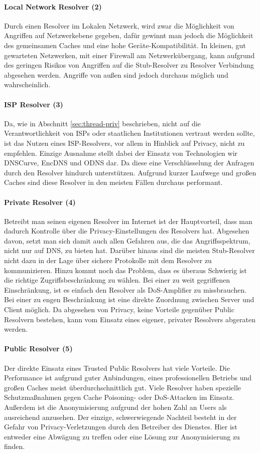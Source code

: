 \paragraph{Local Network Resolver (2)}
Durch einen Resolver im Lokalen Netzwerk, wird zwar die Möglichkeit von Angriffen auf Netzwerkebene gegeben, dafür gewinnt man jedoch die Möglichkeit des gemeinsamen Caches und eine hohe Geräte-Kompatibilität. In kleinen, gut gewarteten Netzwerken, mit einer Firewall am Netzwerkübergang, kann aufgrund des geringen Risikos von Angriffen auf die Stub-Resolver zu Resolver Verbindung abgesehen werden. Angriffe von außen sind jedoch durchaus möglich und wahrscheinlich.

\paragraph{ISP Resolver (3)}
Da, wie in Abschnitt \ref{sec:thread-priv} beschrieben, nicht auf die Verantwortlichkeit von ISPs oder staatlichen Institutionen vertraut werden sollte, ist das Nutzen eines ISP-Resolvers, vor allem in Hinblick auf Privacy, nicht zu empfehlen. Einzige Ausnahme stellt dabei der Einsatz von Technologien wir DNSCurve, EncDNS und ODNS dar. Da diese eine Verschlüsselung der Anfragen durch den Resolver hindurch unterstützen. Aufgrund kurzer Laufwege und großen Caches sind diese Resolver in den meisten Fällen durchaus performant.

\paragraph{Private Resolver (4)}
Betreibt man seinen eigenen Resolver im Internet ist der Hauptvorteil, dass man dadurch Kontrolle über die Privacy-Einstellungen des Resolvers hat. Abgesehen davon, setzt man sich damit auch allen Gefahren aus, die das Angriffsspektrum, nicht nur auf DNS, zu bieten hat. Darüber hinaus sind die meisten Stub-Resolver nicht dazu in der Lage über sichere Protokolle mit dem Resolver zu kommunizieren. Hinzu kommt noch das Problem, dass es überaus Schwierig ist die richtige Zugriffsbeschränkung zu wählen. Bei einer zu weit gegriffenen Einschränkung, ist es einfach den Resolver als DoS-Amplifier zu missbrauchen. Bei einer zu engen Beschränkung ist eine direkte Zuordnung zwischen Server und Client möglich. Da abgesehen von Privacy, keine Vorteile gegenüber Public Resolvern bestehen, kann vom Einsatz eines eigener, privater Resolvers abgeraten werden.

\paragraph{Public Resolver (5)}
Der direkte Einsatz eines Trusted Public Resolvers hat viele Vorteile. Die Performance ist aufgrund guter Anbindungen, eines professionellen Betriebs und großen Caches meist überdurchschnittlich gut. Viele Resolver haben spezielle Schutzmaßnahmen gegen Cache Poisoning- oder DoS-Attacken im Einsatz. Außerdem ist die Anonymisierung aufgrund der hohen Zahl an Users als ausreichend anzusehen. Der einzige, schwerwiegende Nachteil besteht in der Gefahr von Privacy-Verletzungen durch den Betreiber des Dienstes. Hier ist entweder eine Abwägung zu treffen oder eine Lösung zur Anonymisierung zu finden. 

